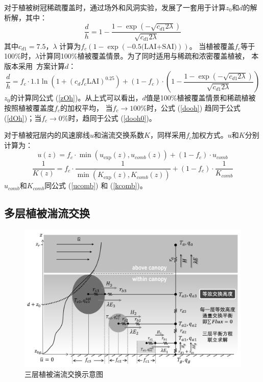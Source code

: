 对于植被树冠稀疏覆盖时，\citet{raupach1992drag,raupach1994simplified}通过场外和风洞实验，发展了一套用于计算$z_0$和$d$的解析解，其中：
\begin{equation}\label{dooh0}
\frac{d}{h}=1-\frac{1-\exp \left(-\sqrt{c_{d1} 2 \lambda}\right)}{\sqrt{c_{d1} 2 \lambda}}
\end{equation}
其中$c_{d1}=7.5$，$\lambda$%
计算为$f_c\left(1-\exp{\left(-0.5\text{(LAI+SAI)}\right)}\right)$。
当植被覆盖$f_c$等于100\%时，$\lambda$计算同100\%植被覆盖情景。为了同时适用与稀疏和浓密覆盖植被，
本版本采用~\citet{dai2019different}方案计算$d$：
\begin{equation}\label{dooh}
\frac{d}{h}=f_{c} \cdot 1.1 \ln \left(1+\left(c_{d} f_{c} \text{LAI}\right)^{0.25}\right)+\left(1-f_{c}\right) \cdot\left(1-\frac{1-\exp \left(-\sqrt{c_{d1} 2 \lambda}\right)}{\sqrt{c_{d1} 2 \lambda}}\right)
\end{equation}
$z_0$的计算同公式 (\ref{zOh})。从上式可以看出，$d$值是100\%植被覆盖情景和稀疏植被按照植被覆盖度$f_c$的加权平均，
当$f_c\rightarrow100\%$时，公式 (\ref{dooh}) 趋同于公式 (\ref{dOh})；当$f_c\rightarrow0\%$时，趋同于公式 (\ref{dooh0})。


对于植被冠层内的风速廓线$u$和湍流交换系数$K$，同样采用$f_c$加权方式。$u$和$K$分别计算为：
\begin{equation}
u(z)=f_{c} \cdot \min \left(u_{\exp }(z), u_{comb}(z)\right)+\left(1-f_{c}\right) \cdot u_{comb}
\end{equation}
\begin{equation}
\frac{1}{K(z)}=f_{c} \cdot \frac{1}{\min \left(K_{\exp}(z), K_{comb}(z)\right)}+\left(1-f_{c}\right) \cdot \frac{1}{K_{comb}}
\end{equation}
$u_{comb}$和$K_{comb}$同公式 (\ref{ucomb}) 和 (\ref{kcomb})。


\subsection{多层植被湍流交换}
{
\begin{figure}[htbp]
\centering
\includegraphics[width=1\linewidth]{Figures/地表湍流交换过程/三层植被湍流交换示意图_v2.jpg}
\caption{三层植被湍流交换示意图}
\label{fig:三层植被湍流交换示意图}
\end{figure}
}

